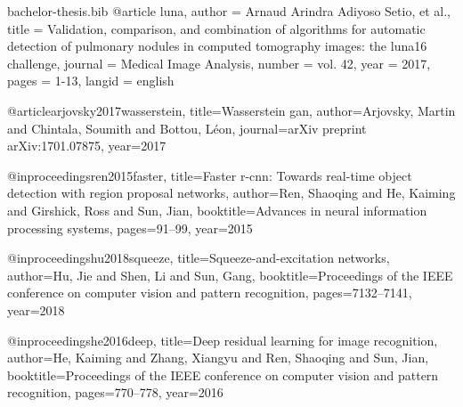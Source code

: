\begin{filecontents}{bachelor-thesis.bib}
@article{ luna,
    author      = {Arnaud Arindra Adiyoso Setio, et al.},
    title       = {Validation, comparison, and combination of algorithms for automatic detection of pulmonary nodules in computed tomography images: the luna16 challenge},
    journal     = {Medical Image Analysis},
    number      = {vol. 42},
    year        = {2017},
    pages       = {1-13},
    langid      = {english}
}

@article{arjovsky2017wasserstein,
  title={Wasserstein gan},
  author={Arjovsky, Martin and Chintala, Soumith and Bottou, L{\'e}on},
  journal={arXiv preprint arXiv:1701.07875},
  year={2017}
}

@inproceedings{ren2015faster,
  title={Faster r-cnn: Towards real-time object detection with region proposal networks},
  author={Ren, Shaoqing and He, Kaiming and Girshick, Ross and Sun, Jian},
  booktitle={Advances in neural information processing systems},
  pages={91--99},
  year={2015}
}

@inproceedings{hu2018squeeze,
  title={Squeeze-and-excitation networks},
  author={Hu, Jie and Shen, Li and Sun, Gang},
  booktitle={Proceedings of the IEEE conference on computer vision and pattern recognition},
  pages={7132--7141},
  year={2018}
}

@inproceedings{he2016deep,
  title={Deep residual learning for image recognition},
  author={He, Kaiming and Zhang, Xiangyu and Ren, Shaoqing and Sun, Jian},
  booktitle={Proceedings of the IEEE conference on computer vision and pattern recognition},
  pages={770--778},
  year={2016}
}

\end{filecontents}


